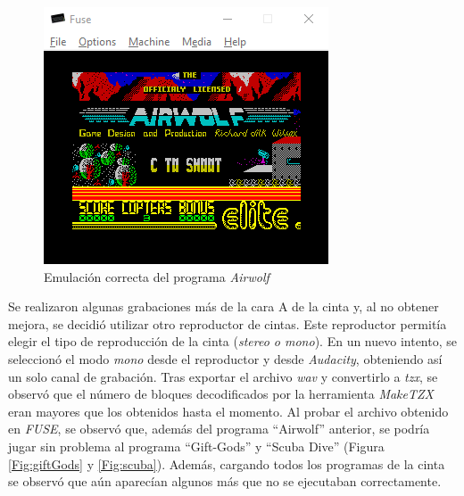 \documentclass{article}
\begin{document}
\begin{figure}[h!]
    \centering
    \includegraphics[scale=0.6]{images/airwolf.png}
    \caption{Emulación correcta del programa \textit{Airwolf}}
    \label{fig:airwolf}
\end{figure}

Se realizaron algunas grabaciones más de la cara A de la cinta y, al no obtener mejora, se decidió utilizar otro reproductor de cintas. Este reproductor permitía elegir el tipo de reproducción de la cinta (\textit{stereo o  mono}). En un nuevo intento, se seleccionó el modo \textit{mono} desde el reproductor y desde \textit{Audacity}, obteniendo así un solo canal de grabación. Tras exportar el archivo \textit{wav} y convertirlo a \textit{tzx}, se observó que el número de bloques decodificados por la herramienta \textit{MakeTZX} eran mayores que los obtenidos hasta el momento. Al probar el archivo obtenido en \textit{FUSE}, se observó que, además del programa ``Airwolf'' anterior, se podría jugar sin problema al programa ``Gift-Gods'' y ``Scuba Dive'' (Figura \ref{Fig:giftGods} y \ref{Fig:scuba}). Además, cargando todos los programas de la cinta se observó que aún aparecían algunos más que no se ejecutaban correctamente.\\
\end{document}
